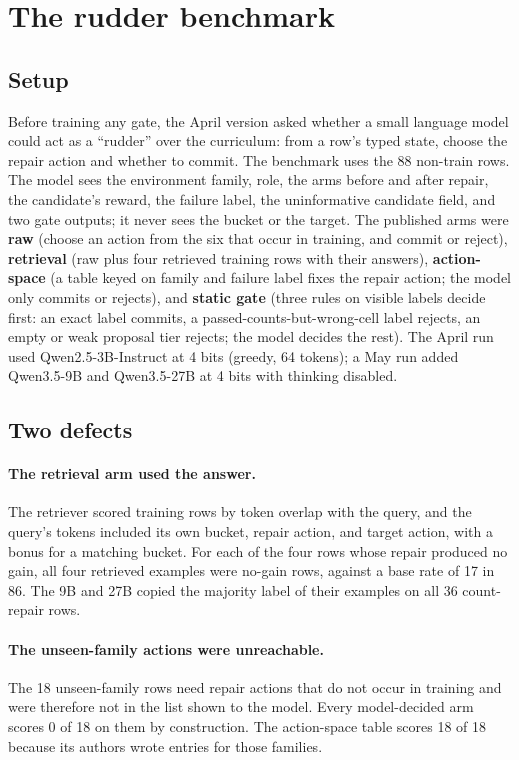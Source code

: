 \documentclass[11pt]{article}
\begin{document}
\section{The rudder benchmark}
\label{sec:rudder}

\subsection{Setup}

Before training any gate, the April version asked whether a small language model could act as a ``rudder'' over the curriculum: from a row's typed state, choose the repair action and whether to commit. The benchmark uses the 88 non-train rows. The model sees the environment family, role, the arms before and after repair, the candidate's reward, the failure label, the uninformative candidate field, and two gate outputs; it never sees the bucket or the target. The published arms were \textbf{raw} (choose an action from the six that occur in training, and commit or reject), \textbf{retrieval} (raw plus four retrieved training rows with their answers), \textbf{action-space} (a table keyed on family and failure label fixes the repair action; the model only commits or rejects), and \textbf{static gate} (three rules on visible labels decide first: an exact label commits, a passed-counts-but-wrong-cell label rejects, an empty or weak proposal tier rejects; the model decides the rest). The April run used Qwen2.5-3B-Instruct at 4 bits (greedy, 64 tokens); a May run added Qwen3.5-9B and Qwen3.5-27B at 4 bits with thinking disabled.

\subsection{Two defects}

\paragraph{The retrieval arm used the answer.} The retriever scored training rows by token overlap with the query, and the query's tokens included its own bucket, repair action, and target action, with a bonus for a matching bucket. For each of the four rows whose repair produced no gain, all four retrieved examples were no-gain rows, against a base rate of 17 in 86. The 9B and 27B copied the majority label of their examples on all 36 count-repair rows.

\paragraph{The unseen-family actions were unreachable.} The 18 unseen-family rows need repair actions that do not occur in training and were therefore not in the list shown to the model. Every model-decided arm scores 0 of 18 on them by construction. The action-space table scores 18 of 18 because its authors wrote entries for those families.
\end{document}
